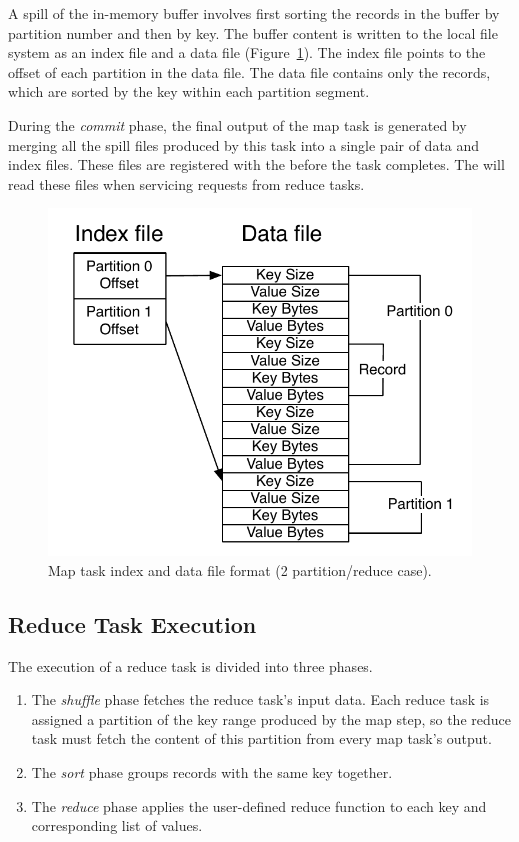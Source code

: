 A spill of the in-memory buffer involves first sorting the records in
the buffer by partition number and then by key. The buffer content is
written to the local file system as an index file and a data file
(Figure~\ref{ch:mrback:fig:mapoutput}). The index file points to the offset of
each partition in the data file. The data file contains only the
records, which are sorted by the key within each partition segment.

During the \emph{commit} phase, the final output of the map task is generated by
merging all the spill files produced by this task into a single pair of data and
index files. These files are registered with the {\TT} before the task
completes. The \TT will read these files when servicing requests from reduce
tasks.

\begin{figure}[t]
  \ssp
  \centering
  \includegraphics[width=0.90\linewidth]{figures/spill_file.pdf}
  \vspace{-8pt}
  \caption{Map task index and data file format (2 partition/reduce case).}
  \label{ch:mrback:fig:mapoutput}
\end{figure}

\subsection{Reduce Task Execution}
\label{ch:mrback:sec:reducetask}
The execution of a reduce task is divided into three phases.
\begin{enumerate}
\item The \emph{shuffle} phase fetches the reduce task's input
  data. Each reduce task is assigned a partition of the key range
  produced by the map step, so the reduce task must fetch the content
  of this partition from every map task's output.
\item The \emph{sort} phase groups records with the same key together.
\item The \emph{reduce} phase applies the user-defined reduce function
  to each key and corresponding list of values.
\end{enumerate}

